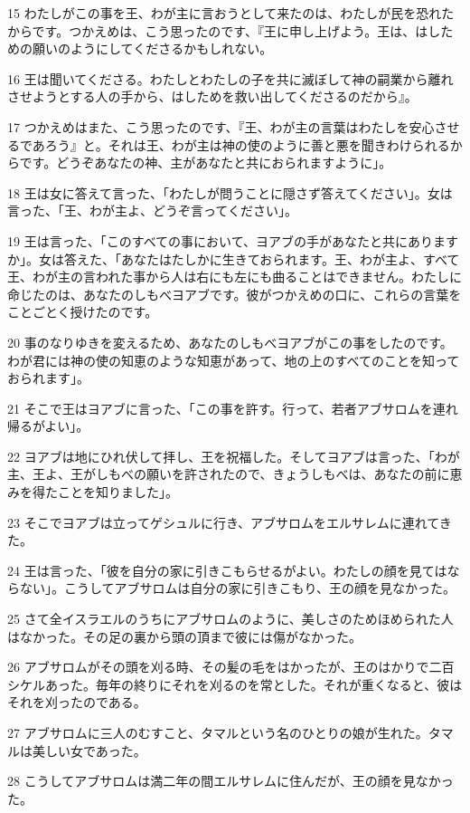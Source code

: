 \par 15 わたしがこの事を王、わが主に言おうとして来たのは、わたしが民を恐れたからです。つかえめは、こう思ったのです、『王に申し上げよう。王は、はしための願いのようにしてくださるかもしれない。
\par 16 王は聞いてくださる。わたしとわたしの子を共に滅ぼして神の嗣業から離れさせようとする人の手から、はしためを救い出してくださるのだから』。
\par 17 つかえめはまた、こう思ったのです、『王、わが主の言葉はわたしを安心させるであろう』と。それは王、わが主は神の使のように善と悪を聞きわけられるからです。どうぞあなたの神、主があなたと共におられますように」。
\par 18 王は女に答えて言った、「わたしが問うことに隠さず答えてください」。女は言った、「王、わが主よ、どうぞ言ってください」。
\par 19 王は言った、「このすべての事において、ヨアブの手があなたと共にありますか」。女は答えた、「あなたはたしかに生きておられます。王、わが主よ、すべて王、わが主の言われた事から人は右にも左にも曲ることはできません。わたしに命じたのは、あなたのしもべヨアブです。彼がつかえめの口に、これらの言葉をことごとく授けたのです。
\par 20 事のなりゆきを変えるため、あなたのしもべヨアブがこの事をしたのです。わが君には神の使の知恵のような知恵があって、地の上のすべてのことを知っておられます」。
\par 21 そこで王はヨアブに言った、「この事を許す。行って、若者アブサロムを連れ帰るがよい」。
\par 22 ヨアブは地にひれ伏して拝し、王を祝福した。そしてヨアブは言った、「わが主、王よ、王がしもべの願いを許されたので、きょうしもべは、あなたの前に恵みを得たことを知りました」。
\par 23 そこでヨアブは立ってゲシュルに行き、アブサロムをエルサレムに連れてきた。
\par 24 王は言った、「彼を自分の家に引きこもらせるがよい。わたしの顔を見てはならない」。こうしてアブサロムは自分の家に引きこもり、王の顔を見なかった。
\par 25 さて全イスラエルのうちにアブサロムのように、美しさのためほめられた人はなかった。その足の裏から頭の頂まで彼には傷がなかった。
\par 26 アブサロムがその頭を刈る時、その髪の毛をはかったが、王のはかりで二百シケルあった。毎年の終りにそれを刈るのを常とした。それが重くなると、彼はそれを刈ったのである。
\par 27 アブサロムに三人のむすこと、タマルという名のひとりの娘が生れた。タマルは美しい女であった。
\par 28 こうしてアブサロムは満二年の間エルサレムに住んだが、王の顔を見なかった。
